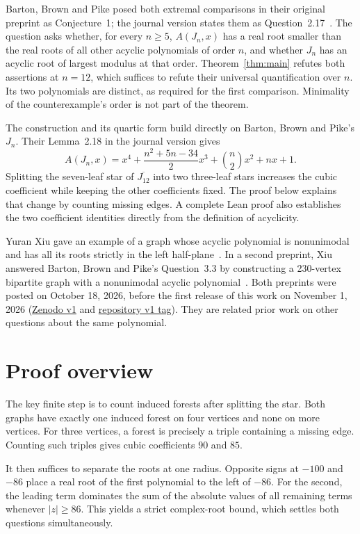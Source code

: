 \documentclass[11pt]{article}
\begin{document}
Barton, Brown and Pike posed both extremal comparisons in their original preprint as Conjecture~1; the journal version states them as Question~2.17~\cite{BBP}. The question asks whether, for every $n\geq5$, $A(J_n,x)$ has a real root smaller than the real roots of all other acyclic polynomials of order $n$, and whether $J_n$ has an acyclic root of largest modulus at that order. Theorem~\ref{thm:main} refutes both assertions at $n=12$, which suffices to refute their universal quantification over $n$. Its two polynomials are distinct, as required for the first comparison. Minimality of the counterexample's order is not part of the theorem.

The construction and its quartic form build directly on Barton, Brown and Pike's $J_n$. Their Lemma~2.18 in the journal version gives
\[
 A(J_n,x)=x^4+\frac{n^2+5n-34}{2}x^3+
             \binom n2 x^2+nx+1.
\]
Splitting the seven-leaf star of $\overline{J_{12}}$ into two three-leaf stars increases the cubic coefficient while keeping the other coefficients fixed. The proof below explains that change by counting missing edges. A complete Lean proof also establishes the two coefficient identities directly from the definition of acyclicity.

Yuran Xiu gave an example of a graph whose acyclic polynomial is nonunimodal and has all its roots strictly in the left half-plane~\cite{XiuStability}. In a second preprint, Xiu answered Barton, Brown and Pike's Question~3.3 by constructing a 230-vertex bipartite graph with a nonunimodal acyclic polynomial~\cite{XiuBipartite}. Both preprints were posted on October 18, 2026, before the first release of this work on November 1, 2026 (\href{https://doi.org/10.5281/zenodo.23862351}{Zenodo v1} and \href{https://github.com/6/clank-lab/tree/acyclic-root-extrema-v1/results/acyclic-root-extrema}{repository v1 tag}). They are related prior work on other questions about the same polynomial.

\section{Proof overview}
The key finite step is to count induced forests after splitting the star. Both graphs have exactly one induced forest on four vertices and none on more vertices. For three vertices, a forest is precisely a triple containing a missing edge. Counting such triples gives cubic coefficients $90$ and $85$.

It then suffices to separate the roots at one radius. Opposite signs at $-100$ and $-86$ place a real root of the first polynomial to the left of $-86$. For the second, the leading term dominates the sum of the absolute values of all remaining terms whenever $|z|\geq86$. This yields a strict complex-root bound, which settles both questions simultaneously.
\end{document}
